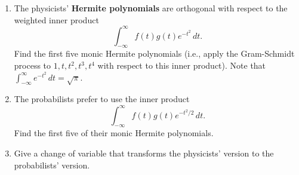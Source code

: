 \documentclass[10pt]{extarticle}
\begin{document}
\newpage

\begin{problem}[Problem 5]
\begin{enumerate}[label=(\alph*)]
\item The physicists' \textbf{Hermite polynomials} are orthogonal with respect to the weighted inner product
\[
\int_{-\infty}^\infty f(t)g(t)e^{-t^2}\,dt.
\]
Find the first five monic Hermite polynomials (i.e., apply the Gram-Schmidt process to $1,t,t^2,t^3,t^4$ with respect to this inner product). Note that $\int_{-\infty}^\infty e^{-t^2}\,dt=\sqrt{\pi}$.
\item The probabilists prefer to use the inner product
\[
\int_{-\infty}^\infty f(t)g(t)e^{-t^2/2}\,dt.
\]
Find the first five of their monic Hermite polynomials.
\item Give a change of variable that transforms the physicists' version to the probabilists' version.
\end{enumerate}
\end{problem}
\end{document}
